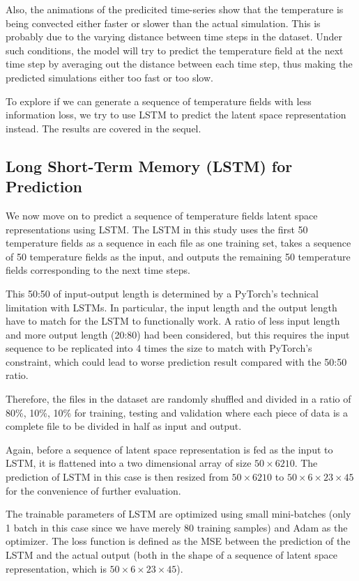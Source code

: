 Also, the animations of the predicited time-series show that the temperature is being convected either faster or slower than the actual simulation. This is probably due to the varying distance between time steps in the dataset. Under such conditions, the model will try to predict the temperature field at the next time step by averaging out the distance between each time step, thus making the predicted simulations either too fast or too slow.

To explore if we can generate a sequence of temperature fields with less information loss, we try to use LSTM to predict the latent space representation instead. The results are covered in the sequel.


\subsection{Long Short-Term Memory (LSTM) for Prediction}

We now move on to predict a sequence of temperature fields latent space representations using LSTM. The LSTM in this study uses the first 50 temperature fields as a sequence in each file as one training set, takes a sequence of 50 temperature fields as the input, and outputs the remaining 50 temperature fields corresponding to the next time steps.

This 50:50 of input-output length is determined by a PyTorch's technical limitation with LSTMs. In particular, the input length and the output length have to match for the LSTM to functionally work. A ratio of less input length and more output length (20:80) had been considered, but this requires the input sequence to be replicated into 4 times the size to match with PyTorch's constraint, which could lead to worse prediction result compared with the 50:50 ratio.

Therefore, the files in the dataset are randomly shuffled and divided in a ratio of 80\%, 10\%, 10\% for training, testing and validation where each piece of data is a complete file to be divided in half as input and output.

Again, before a sequence of latent space representation is fed as the input to LSTM, it is flattened into a two dimensional array of size $50 \times 6210$. The prediction of LSTM in this case is then resized from $50 \times 6210$ to $50 \times 6 \times 23 \times 45$ for the convenience of further evaluation.

The trainable parameters of LSTM are optimized using small mini-batches (only 1 batch in this case since we have merely 80 training samples) and Adam as the optimizer. The loss function is defined as the MSE between the prediction of the LSTM and the actual output (both in the shape of a sequence of latent space representation, which is $50 \times 6 \times 23 \times 45$).

